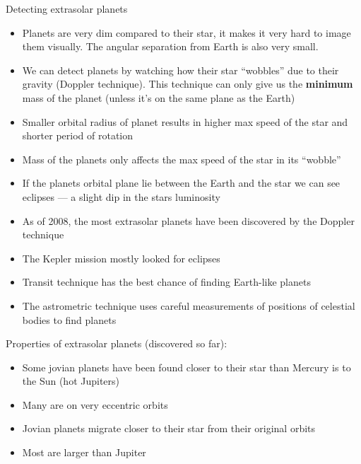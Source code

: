 \documentclass[12pt]{article}
\begin{document}
Detecting extrasolar planets
\begin{itemize}
    \item Planets are very dim compared to their star, it makes it very hard to image them visually.  The angular separation from Earth is also very small.
    \item We can detect planets by watching how their star ``wobbles'' due to their gravity (Doppler technique).  This technique can only give us the \textbf{minimum} mass of the planet (unless it's on the same plane as the Earth)
    \item Smaller orbital radius of planet results in higher max speed of the star and shorter period of rotation
    \item Mass of the planets only affects the max speed of the star in its ``wobble''
    \item If the planets orbital plane lie between the Earth and the star we can see eclipses --- a slight dip in the stars luminosity
    \item As of 2008, the most extrasolar planets have been discovered by the Doppler technique
    \item The Kepler mission mostly looked for eclipses
    \item Transit technique has the best chance of finding Earth-like planets
    \item The astrometric technique uses careful measurements of positions of celestial bodies to find planets
\end{itemize}

Properties of extrasolar planets (discovered so far):
\begin{itemize}
    \item Some jovian planets have been found closer to their star than Mercury is to the Sun (hot Jupiters)
    \item Many are on very eccentric orbits
    \item Jovian planets migrate closer to their star from their original orbits
    \item Most are larger than Jupiter
\end{itemize}
\end{document}
